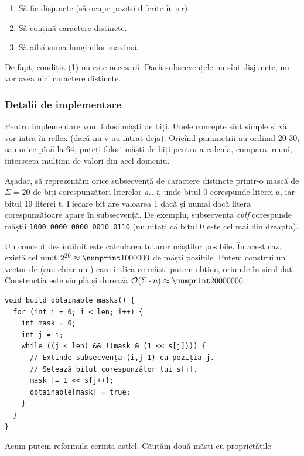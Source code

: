 \documentclass[../main.tex]{subfiles}
\begin{document}
\begin{enumerate}
  \item Să fie disjuncte (să ocupe poziții diferite în șir).
  \item Să conțină caractere distincte.
  \item Să aibă suma lungimilor maximă.
\end{enumerate}

De fapt, condiția (1) nu este necesară. Dacă subsecvențele nu sînt disjuncte, nu vor avea nici caractere distincte.

\subsubsection*{Detalii de implementare}

Pentru implementare vom folosi măști de biți. Unele concepte sînt simple și vă vor intra în reflex (dacă nu v-au intrat deja). Oricînd parametrii au ordinul 20-30, sau orice pînă la 64, puteți folosi măști de biți pentru a calcula, compara, reuni, intersecta mulțimi de valori din acel domeniu.

Așadar, să reprezentăm orice subsecvență de caractere distincte printr-o mască de $\Sigma = 20$ de biți corespunzători literelor \textit{a...t}, unde bitul 0 corespunde literei a, iar bitul 19 literei t. Fiecare bit are valoarea 1 dacă și numai dacă litera corespunzătoare apare în subsecvență. De exemplu, subsecvența \textit{cbtf} corespunde măștii \texttt{1000 0000 0000 0010 0110} (nu uitați că bitul 0 este cel mai din dreapta).

Un concept des întîlnit este calcularea tuturor măștilor posibile. În acest caz, există cel mult $2^{20} \approx \np{1000000}$ de măști posibile. Putem construi un vector de  (sau chiar un ) care indică ce măști putem obține, oriunde în șirul dat. Construcția este simplă și durează $\bigoh(\Sigma \cdot n) \approx \np{20000000}$.

\begin{verbatim}
void build_obtainable_masks() {
  for (int i = 0; i < len; i++) {
    int mask = 0;
    int j = i;
    while ((j < len) && !(mask & (1 << s[j]))) {
      // Extinde subsecvența (i,j-1) cu poziția j.
      // Setează bitul corespunzător lui s[j].
      mask |= 1 << s[j++];
      obtainable[mask] = true;
    }
  }
}
\end{verbatim}

Acum putem reformula cerința astfel. Căutăm două măști cu proprietățile:
\end{document}

